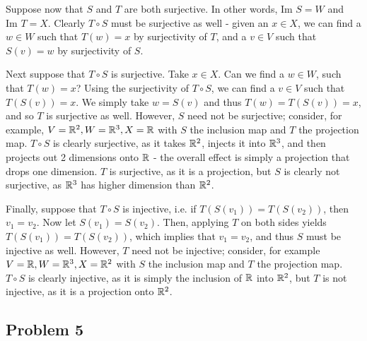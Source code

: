 \documentclass{../../mathnotes}
\begin{document}
Suppose now that $S$ and $T$ are both surjective. In other words, $\text{Im }S=W$ and $\text{Im }T=X$.
Clearly $T\circ S$ must be surjective as well - given an $x\in X$, we can find a $w\in W$ such that
$T(w)=x$ by surjectivity of $T$, and a $v\in V$ such that $S(v)=w$ by surjectivity of $S$.

Next suppose that $T\circ S$ is surjective. Take $x\in X$. Can we find a $w\in W$, such that $T(w)=x$? 
Using the surjectivity of $T\circ S$, we can find a $v\in V$ such that $T(S(v))=x$. We simply take
$w=S(v)$ and thus $T(w)=T(S(v))=x$, and so $T$ is surjective as well. However, $S$ need not be
surjective; consider, for example, $V=\mathbb{R}^2,W=\mathbb{R}^3,X=\mathbb{R}$ with $S$ the inclusion map and $T$ the
projection map. $T\circ S$ is clearly surjective, as it takes $\mathbb{R}^2$, injects it into $\mathbb{R}^3$,
and then projects out 2 dimensions onto $\mathbb{R}$ - the overall effect is simply a projection that
drops one dimension. $T$ is surjective, as it is a projection, but $S$ is clearly not surjective,
as $\mathbb{R}^3$ has higher dimension than $\mathbb{R}^2$.

Finally, suppose that $T\circ S$ is injective, i.e. if $T(S(v_1))=T(S(v_2))$,
then $v_1=v_2$. Now let $S(v_1)=S(v_2)$. Then, applying $T$ on both sides yields
$T(S(v_1))=T(S(v_2))$, which implies that $v_1=v_2$, and thus $S$ must be injective as well.
However, $T$ need not be injective; consider, for example $V=\mathbb{R},W=\mathbb{R}^3,X=\mathbb{R}^2$ with $S$
the inclusion map and $T$ the projection map. $T\circ S$ is clearly injective, as it is simply
the inclusion of $\mathbb{R}$ into $\mathbb{R}^2$, but $T$ is not injective, as it is a projection onto $\mathbb{R}^2$.

\subsection*{Problem 5}
\end{document}
